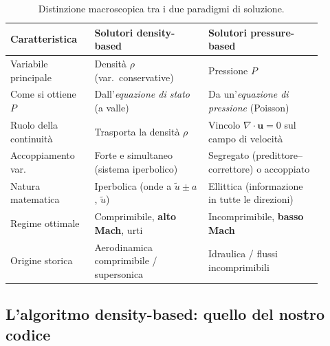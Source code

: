 \begin{table}[H]
\centering
\caption{Distinzione macroscopica tra i due paradigmi di soluzione.}
\label{tab:paradigmi_caratteristiche}
\renewcommand{\arraystretch}{1.3}
\begin{tabular}{p{0.24\linewidth} p{0.33\linewidth} p{0.33\linewidth}}
\toprule
\textbf{Caratteristica} & \textbf{Solutori density-based} & \textbf{Solutori pressure-based} \\
\midrule
Variabile principale & Densità $\rho$ (var.\ conservative) & Pressione $P$ \\
Come si ottiene $P$ & Dall'\emph{equazione di stato} (a valle) & Da un'\emph{equazione di pressione} (Poisson) \\
Ruolo della continuità & Trasporta la densità $\rho$ & Vincolo $\nabla\cdot\bm u=0$ sul campo di velocità \\
Accoppiamento var. & Forte e simultaneo (sistema iperbolico) & Segregato (predittore--correttore) o accoppiato \\
Natura matematica & Iperbolica (onde a $\tilde u\pm a$, $\tilde u$) & Ellittica (informazione in tutte le direzioni) \\
Regime ottimale & Comprimibile, \textbf{alto Mach}, urti & Incomprimibile, \textbf{basso Mach} \\
Origine storica & Aerodinamica comprimibile / supersonica & Idraulica / flussi incomprimibili \\
\bottomrule
\end{tabular}
\end{table}

\subsection{L'algoritmo density-based: quello del nostro codice}
\label{sub:algoritmo_db}

